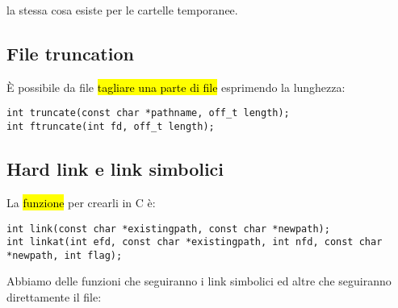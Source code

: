 la stessa cosa esiste per le cartelle temporanee.


\subsection{File truncation}

È possibile da file \hl{tagliare una parte di file} esprimendo la lunghezza:

\begin{lstlisting}
int truncate(const char *pathname, off_t length); 
int ftruncate(int fd, off_t length);
\end{lstlisting}


\subsection{Hard link e link simbolici}

La \hl{funzione} per crearli in C è:

\begin{lstlisting}
int link(const char *existingpath, const char *newpath);
int linkat(int efd, const char *existingpath, int nfd, const char *newpath, int flag);
\end{lstlisting}

Abbiamo delle funzioni che seguiranno i link simbolici ed altre che seguiranno direttamente il file:


